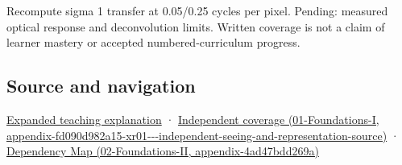 Recompute sigma 1 transfer at 0.05/0.25 cycles per pixel. Pending: measured optical response and deconvolution limits. Written coverage is not a claim of learner mastery or accepted numbered-curriculum progress.

\subsection{Source and navigation}\label{appendix-8b76b0efd27f-source-and-navigation}

\hyperref[04-visual-computing-ii-ch042-a-footprint-is-more-meaningful-than-an-isolated-pixel-center]{Expanded teaching explanation} · \href{../01-Foundations-I/main.pdf\#nameddest=appendix-fd090d982a15-xr01---independent-seeing-and-representation-source}{Independent coverage (01-Foundations-I, appendix-fd090d982a15-xr01-\/-\/-independent-seeing-and-representation-source)} · \href{../02-Foundations-II/main.pdf\#nameddest=appendix-4ad47bdd269a}{Dependency Map (02-Foundations-II, appendix-4ad47bdd269a)}
